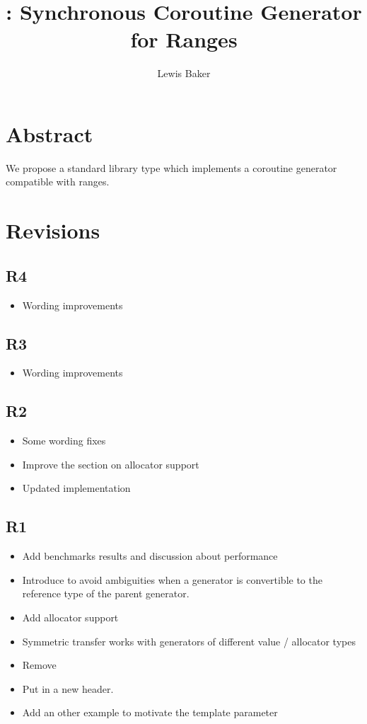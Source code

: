 \documentclass{wg21}
\title{\tcode{std::generator}: Synchronous Coroutine Generator for Ranges}
\author{Lewis Baker}{lewissbaker@gmail.com}
\begin{document}
\maketitle


\section{Abstract}

We propose a standard library type  which implements a coroutine generator compatible with ranges.


\section{Revisions}

\subsection{R4}
\begin{itemize}
\item Wording improvements
\end{itemize}

\subsection{R3}
\begin{itemize}
\item Wording improvements
\end{itemize}

\subsection{R2}
\begin{itemize}
\item Some wording fixes
\item Improve the section on allocator support
\item Updated implementation
\end{itemize}

\subsection{R1}
\begin{itemize}
\item Add benchmarks results and discussion about performance
\item Introduce  to avoid ambiguities when a generator is convertible to the reference type of the parent generator.
\item Add allocator support
\item Symmetric transfer works with generators of different value / allocator types
\item Remove 
\item Put  in a new  header.
\item Add an other example to motivate the  template parameter
\end{itemize}
\end{document}
